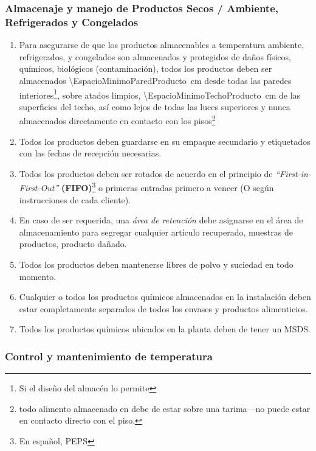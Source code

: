 \subsubsection{Almacenaje y manejo de Productos Secos / Ambiente, Refrigerados y Congelados}
\begin{enumerate}
	\item Para asegurarse de que los productos almacenables a temperatura ambiente, refrigerados, y congelados son almacenados y protegidos de daños físicos, químicos, biológicos (contaminación), todos los productos deben ser almacenados \qty{\EspacioMinimoParedProducto}{\centi\meter} desde todas las paredes interiores\footnote{Si el diseño del almacén lo permite}, sobre atados limpios, \qty{\EspacioMinimoTechoProducto}{\centi\meter} de las superficies del techo, así como lejos de todas las luces superiores y nunca almacenados directamente en contacto con los pisos\footnote{todo \gls{alimento} almacenado en  debe de estar sobre una tarima---no puede estar en contacto directo con el piso.}
	\item Todos los productos deben guardarse en su empaque secundario y etiquetados con las fechas de recepción necesarias.
	\item Todos los productos deben ser rotados de acuerdo en el principio de \textit{“First-in-First-Out”} \textbf{(FIFO)}\footnote{En español, \gls{PEPS}} o primeras entradas primero a vencer (O según instrucciones de cada cliente).
	\item En caso de ser requerida, una \emph{área de retención} debe asignarse en el área de almacenamiento para segregar cualquier artículo recuperado, muestras de productos, producto dañado. 
	\item Todos los productos deben mantenerse libres de polvo y suciedad en todo momento.
	\item Cualquier o todos los productos químicos almacenados en la instalación deben estar completamente separados de todos los envases y productos alimenticios.
	\item Todos los productos químicos ubicados en la planta deben de tener un MSDS.
\end{enumerate}

\subsubsection{Control y mantenimiento de temperatura}


